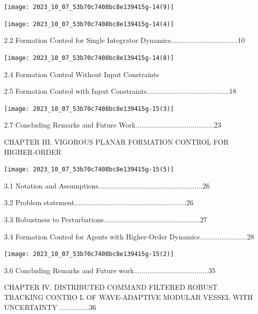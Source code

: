 \documentclass[10pt]{article}
\begin{document}
\begin{center}
\texttt{[image: 2023\_10\_07\_53b70c7408bc8e139415g-14(9)]}
\end{center}

\begin{center}
\texttt{[image: 2023\_10\_07\_53b70c7408bc8e139415g-14(4)]}
\end{center}

2.2 Formation Control for Single Integrator Dynamics..................................10

\begin{center}
\texttt{[image: 2023\_10\_07\_53b70c7408bc8e139415g-14(8)]}
\end{center}

2.4 Formation Control Without Input Constraints

2.5 Formation Control with Input Constraints..........................................18

\begin{center}
\texttt{[image: 2023\_10\_07\_53b70c7408bc8e139415g-15(3)]}
\end{center}

2.7 Concluding Remarks and Future Work........................................23

CHAPTER III. VIGOROUS PLANAR FORMATION CONTROL FOR HIGHER-ORDER

\begin{center}
\texttt{[image: 2023\_10\_07\_53b70c7408bc8e139415g-15(5)]}
\end{center}

3.1 Notation and Assumptions.....................................................26

3.2 Problem statement.........................................................26

3.3 Robustness to Perturbations.................................................27

3.4 Formation Control for Agents with Higher-Order Dynamics........................28

\begin{center}
\texttt{[image: 2023\_10\_07\_53b70c7408bc8e139415g-15(2)]}
\end{center}

3.6 Concluding Remarks and Future work......................................35

CHAPTER IV. DISTRIBUTED COMMAND FILTERED ROBUST TRACKING CONTRO L OF WAVE-ADAPTIVE MODULAR VESSEL WITH UNCERTAINTY ...............36
\end{document}
